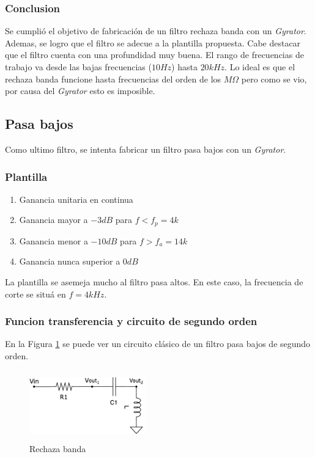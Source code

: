 \documentclass[12pt,a4paper]{article}
\begin{document}
\subsubsection{Conclusion}

Se cumplió el objetivo de fabricación de un filtro rechaza banda con un \textit{Gyrator}. Ademas, se logro que el filtro se adecue a la plantilla propuesta. Cabe destacar que el filtro cuenta con una profundidad muy buena. El rango de frecuencias de trabajo va desde las bajas frecuencias ($10Hz$) hasta $20kHz$. Lo ideal es que el rechaza banda funcione hasta frecuencias del orden de los $M\Omega$ pero como se vio, por causa del \textit{Gyrator} esto es imposible. 




\subsection{Pasa bajos}

Como ultimo filtro, se intenta fabricar un filtro pasa bajos con un \textit{Gyrator}.


\subsubsection{Plantilla}

\begin{enumerate}
	\item Ganancia unitaria en continua
	\item Ganancia mayor a $-3dB$ para $f<f_p = 4k$
	\item Ganancia menor a $-10dB$ para $f>f_a = 14k$
	\item Ganancia nunca superior a $0dB$
\end{enumerate}

La plantilla se asemeja mucho al filtro pasa altos. En este caso, la frecuencia de corte se situá en $f=4kHz$.

\subsubsection{Funcion transferencia y circuito de segundo orden}

En la Figura \ref{ej2_filto_LP} se puede ver un circuito clásico de un filtro pasa bajos de segundo orden. 

\begin{figure}[h!]                                                       
\centering\includegraphics[width=5cm, height=3cm]{Resources/ej2_lp.png}
\caption{Rechaza banda}
\label{ej2_filto_LP}
\end{figure}
\end{document}
